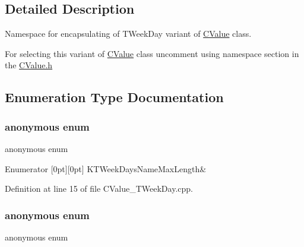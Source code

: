 \subsection{Detailed Description}
Namespace for encapsulating of {\ttfamily T\+Week\+Day} variant of \hyperlink{class_c_value___t_week_day_1_1_c_value}{C\+Value} class. 

For selecting this variant of \hyperlink{class_c_value___t_week_day_1_1_c_value}{C\+Value} class uncomment {\ttfamily using} {\ttfamily namespace} section in the \hyperlink{_c_value_8h}{C\+Value.\+h} 

\subsection{Enumeration Type Documentation}
\mbox{\label{namespace_c_value___t_week_day_ae2f386969b6b243f70cc768d81d87f37}} 
\subsubsection{\texorpdfstring{anonymous enum}{anonymous enum}}
{\footnotesize\ttfamily anonymous enum}

\begin{DoxyEnumFields}{Enumerator}
[0pt][0pt]{}\mbox{\label{namespace_c_value___t_week_day_ae2f386969b6b243f70cc768d81d87f37a82610dbf312a8592086eff40a38e1ff8}} 
K\+T\+Week\+Days\+Name\+Max\+Length&\\
\hline

\end{DoxyEnumFields}


Definition at line 15 of file C\+Value\+\_\+\+T\+Week\+Day.\+cpp.

\mbox{\label{namespace_c_value___t_week_day_aafc13db7f1761bc02fc24499d9d30ef8}} 
\subsubsection{\texorpdfstring{anonymous enum}{anonymous enum}}
{\footnotesize\ttfamily anonymous enum}



